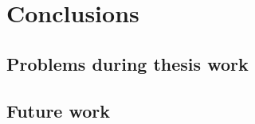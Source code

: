 \section{Conclusions}
\label{sec:conclusion}

\subsection{Problems during thesis work}
\label{sec:problems}

\subsection{Future work}
\label{sec:future}